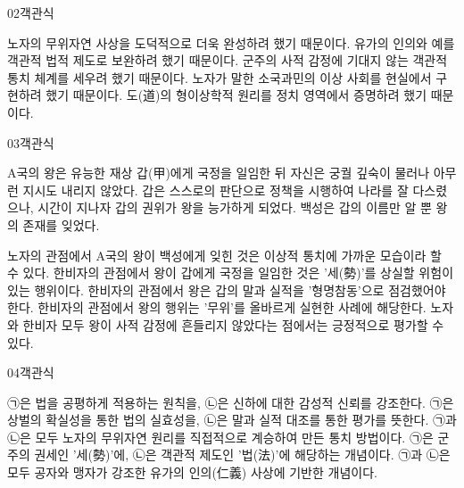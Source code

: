 \documentclass[fs85,seriesWit]{korfarm-base}
\begin{document}
\begin{kfQBlock}{02}{객관식}
\begin{kfChoices}
\kfChoice 노자의 무위자연 사상을 도덕적으로 더욱 완성하려 했기 때문이다.
\kfChoice 유가의 인의와 예를 객관적 법적 제도로 보완하려 했기 때문이다.
\kfChoice 군주의 사적 감정에 기대지 않는 객관적 통치 체계를 세우려 했기 때문이다.
\kfChoice 노자가 말한 소국과민의 이상 사회를 현실에서 구현하려 했기 때문이다.
\kfChoice 도(道)의 형이상학적 원리를 정치 영역에서 증명하려 했기 때문이다.
\end{kfChoices}
\end{kfQBlock}

\begin{kfQBlock}{03}{객관식}
\begin{kfEvidence}A국의 왕은 유능한 재상 갑(甲)에게 국정을 일임한 뒤 자신은 궁궐 깊숙이 물러나 아무런 지시도 내리지 않았다. 갑은 스스로의 판단으로 정책을 시행하여 나라를 잘 다스렸으나, 시간이 지나자 갑의 권위가 왕을 능가하게 되었다. 백성은 갑의 이름만 알 뿐 왕의 존재를 잊었다.\end{kfEvidence}
\begin{kfChoices}
\kfChoice 노자의 관점에서 A국의 왕이 백성에게 잊힌 것은 이상적 통치에 가까운 모습이라 할 수 있다.
\kfChoice 한비자의 관점에서 왕이 갑에게 국정을 일임한 것은 '세(勢)'를 상실할 위험이 있는 행위이다.
\kfChoice 한비자의 관점에서 왕은 갑의 말과 실적을 '형명참동'으로 점검했어야 한다.
\kfChoice 한비자의 관점에서 왕의 행위는 '무위'를 올바르게 실현한 사례에 해당한다.
\kfChoice 노자와 한비자 모두 왕이 사적 감정에 흔들리지 않았다는 점에서는 긍정적으로 평가할 수 있다.
\end{kfChoices}
\end{kfQBlock}

\begin{kfQBlock}{04}{객관식}
\begin{kfChoices}
\kfChoice ㉠은 법을 공평하게 적용하는 원칙을, ㉡은 신하에 대한 감성적 신뢰를 강조한다.
\kfChoice ㉠은 상벌의 확실성을 통한 법의 실효성을, ㉡은 말과 실적 대조를 통한 평가를 뜻한다.
\kfChoice ㉠과 ㉡은 모두 노자의 무위자연 원리를 직접적으로 계승하여 만든 통치 방법이다.
\kfChoice ㉠은 군주의 권세인 '세(勢)'에, ㉡은 객관적 제도인 '법(法)'에 해당하는 개념이다.
\kfChoice ㉠과 ㉡은 모두 공자와 맹자가 강조한 유가의 인의(仁義) 사상에 기반한 개념이다.
\end{kfChoices}
\end{kfQBlock}
\end{document}
